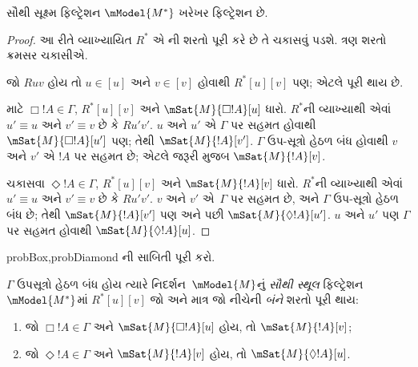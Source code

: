 \begin{prop}
  સૌથી સૂક્ષ્મ ફિલ્ટ્રેશન $\mModel{M^*}$ ખરેખર ફિલ્ટ્રેશન છે.
\end{prop}

\begin{proof}
  આ રીતે વ્યાખ્યાયિત $R^*$ એ
  ની
  શરતો પૂરી કરે છે તે ચકાસવું પડશે. ત્રણ શરતો ક્રમસર ચકાસીએ.

  જો $Ruv$ હોય તો $u \in [u]$ અને $v \in [v]$ હોવાથી
  $R^*[u][v]$ પણ; એટલે  પૂરી થાય છે.

       માટે $\Box!A \in \Gamma$,
      $R^*[u][v]$ અને $\mSat{M}{\Box!A}[u]$ ધારો.
      $R^*$ની વ્યાખ્યાથી એવાં $u' \equiv u$ અને
      $v' \equiv v$ છે કે $Ru'v'$. $u$ અને $u'$ એ $\Gamma$ પર
      સહમત હોવાથી $\mSat{M}{\Box!A}[u']$ પણ; તેથી
      $\mSat{M}{!A}[v']$. $\Gamma$ ઉપ-સૂત્રો હેઠળ બંધ હોવાથી
      $v$ અને $v'$ એ $!A$ પર સહમત છે; એટલે જરૂરી મુજબ
      $\mSat{M}{!A}[v]$.

       ચકાસવા $\Diamond!A \in
      \Gamma$, $R^*[u][v]$ અને $\mSat{M}{!A}[v]$ ધારો.
      $R^*$ની વ્યાખ્યાથી એવાં $u' \equiv u$ અને
      $v' \equiv v$ છે કે $Ru'v'$. $v$ અને $v'$ એ~$\Gamma$ પર
      સહમત છે, અને $\Gamma$ ઉપ-સૂત્રો હેઠળ બંધ છે;
      તેથી $\mSat{M}{!A}[v']$ પણ અને પછી
      $\mSat{M}{\Diamond !A}[u']$. $u$ અને $u'$ પણ $\Gamma$ પર
      સહમત હોવાથી $\mSat{M}{\Diamond !A}[u]$.
\end{proof}


\begin{probtag}{probBox,probDiamond}
  ની સાબિતી પૂરી કરો.
\end{probtag}

\begin{defn}
  $\Gamma$ ઉપસૂત્રો હેઠળ બંધ હોય ત્યારે નિદર્શન~$\mModel{M}$નું
  \emph{સૌથી સ્થૂલ} ફિલ્ટ્રેશન~$\mModel{M^*}$માં
  $R^*[u][v]$ જો અને માત્ર જો
  નીચેની
    \emph{બંને} શરતો પૂરી થાય:
  \begin{enumerate}
  \item {}જો $\Box!A \in \Gamma$
    અને $\mSat{M}{\Box!A}[u]$ હોય, તો
    $\mSat{M}{!A}[v]$;
  \item {}જો $\Diamond!A
    \in \Gamma$ અને $\mSat{M}{!A}[v]$ હોય, તો
    $\mSat{M}{\Diamond!A}[u]$.
  \end{enumerate}
\end{defn}

